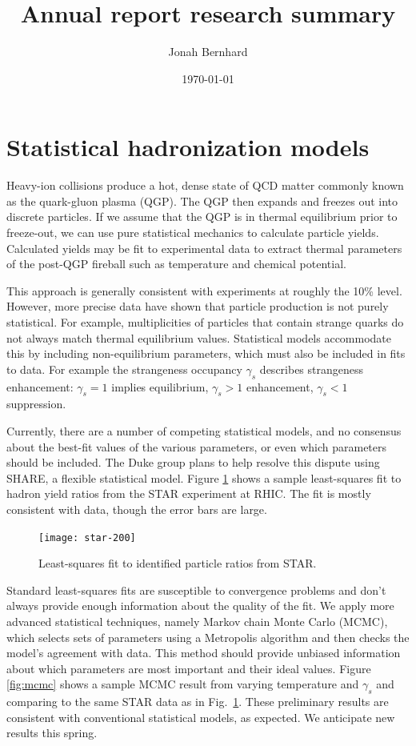 \documentclass[twocolumn,10pt,amsmath]{revtex4-1}
\begin{document}
\title{Annual report research summary}
\author{Jonah Bernhard}
\date{\today}


\maketitle



\section{Statistical hadronization models}

Heavy-ion collisions produce a hot, dense state of QCD matter commonly known as the quark-gluon plasma (QGP).  The QGP then expands and freezes out into
discrete particles.  If we assume that the QGP is in thermal equilibrium prior to freeze-out, we can use pure statistical mechanics to calculate particle
yields.  Calculated yields may be fit to experimental data to extract thermal parameters of the post-QGP fireball such as temperature and chemical potential.

This approach is generally consistent with experiments at roughly the 10\% level.  However, more precise data have shown that particle production is not purely
statistical.  For example, multiplicities of particles that contain strange quarks do not always match thermal equilibrium values.  Statistical models
accommodate this by including non-equilibrium parameters, which must also be included in fits to data.  For example the strangeness occupancy $\gamma_s$
describes strangeness enhancement:  $\gamma_s = 1$ implies equilibrium, $\gamma_s > 1$ enhancement, $\gamma_s < 1$ suppression.

Currently, there are a number of competing statistical models, and no consensus about the best-fit values of the various parameters, or even which parameters
should be included.  The Duke group plans to help resolve this dispute using SHARE, a flexible statistical model.  Figure \ref{fig:ratiofit} shows a sample
least-squares fit to hadron yield ratios from the STAR experiment at RHIC.  The fit is mostly consistent with data, though the error bars are large.

\begin{figure}[b]
  \centering
  \texttt{[image: star-200]}
  \caption{Least-squares fit to identified particle ratios from STAR.}
  \label{fig:ratiofit}
\end{figure}

Standard least-squares fits are susceptible to convergence problems and don't always provide enough information about the quality of the fit.  We apply more
advanced statistical techniques, namely Markov chain Monte Carlo (MCMC), which selects sets of parameters using a Metropolis algorithm and then checks the model's
agreement with data.  This method should provide unbiased information about which parameters are most important and their ideal values.
Figure \ref{fig:mcmc} shows a sample MCMC result from varying temperature and $\gamma_s$ and comparing to the same STAR data as in Fig.\ \ref{fig:ratiofit}.
These preliminary results are consistent with conventional statistical models, as expected.  We anticipate new results this spring.
\end{document}

